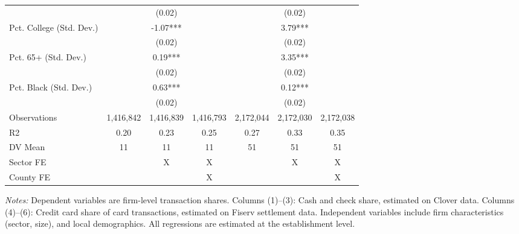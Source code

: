 \documentclass[11pt,english]{article}
\theoremstyle{remark}
\begin{document}
\begin{table}[H]
\begin{centering}
{{\begin{tabular}{l*{6}{c}}
                    &                     &      (0.02)         &                     &                     &      (0.02)         &                     \\
[1em]
Pct. College (Std. Dev.)&                     &       -1.07***&                     &                     &        3.79***&                     \\
                    &                     &      (0.02)         &                     &                     &      (0.02)         &                     \\
[1em]
Pct. 65+ (Std. Dev.)&                     &        0.19***&                     &                     &        3.35***&                     \\
                    &                     &      (0.02)         &                     &                     &      (0.02)         &                     \\
[1em]
Pct. Black (Std. Dev.)&                     &        0.63***&                     &                     &        0.12***&                     \\
                    &                     &      (0.02)         &                     &                     &      (0.02)         &                     \\
\hline
Observations        &   1,416,842         &   1,416,839         &   1,416,793         &   2,172,044         &   2,172,030         &   2,172,038         \\
R2                  &        0.20         &        0.23         &        0.25         &        0.27         &        0.33         &        0.35         \\
DV Mean             &          11         &          11         &          11         &          51         &          51         &          51         \\
Sector FE           &                     &           X         &           X         &                     &           X         &           X         \\
County FE           &                     &                     &           X         &                     &                     &           X         \\
\hline
\end{tabular}
}
 }
\par\end{centering}
\par\textit{Notes:} Dependent variables are firm-level transaction shares. Columns (1)--(3): Cash and check share, estimated on Clover data. Columns (4)--(6): Credit card share of card transactions, estimated on Fiserv settlement data. Independent variables include firm characteristics (sector, size), and local demographics. All regressions are estimated at the establishment level.
\end{table}
\end{document}
